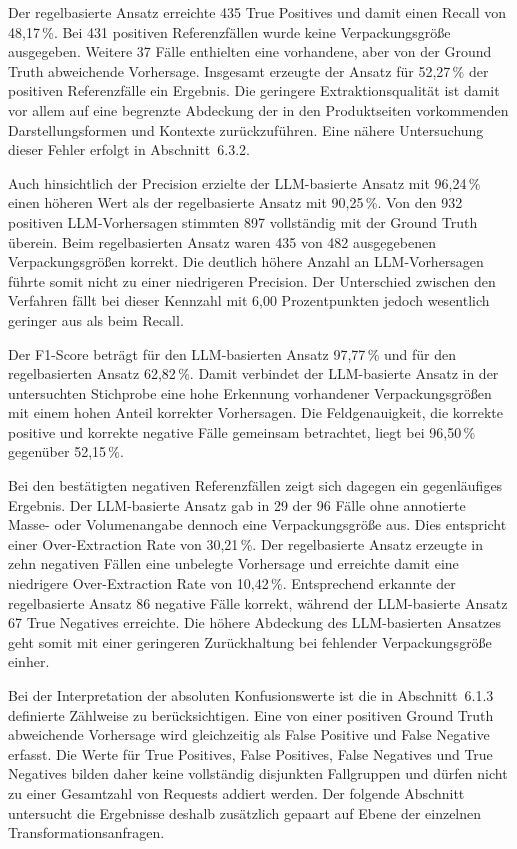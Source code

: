 Der regelbasierte Ansatz erreichte 435 True Positives und damit einen Recall von 48,17\,\%. Bei 431 positiven Referenzfällen wurde keine Verpackungsgröße ausgegeben. Weitere 37 Fälle enthielten eine vorhandene, aber von der Ground Truth abweichende Vorhersage. Insgesamt erzeugte der Ansatz für 52,27\,\% der positiven Referenzfälle ein Ergebnis. Die geringere Extraktionsqualität ist damit vor allem auf eine begrenzte Abdeckung der in den Produktseiten vorkommenden Darstellungsformen und Kontexte zurückzuführen. Eine nähere Untersuchung dieser Fehler erfolgt in Abschnitt~6.3.2.

Auch hinsichtlich der Precision erzielte der LLM-basierte Ansatz mit 96,24\,\% einen höheren Wert als der regelbasierte Ansatz mit 90,25\,\%. Von den 932 positiven LLM-Vorhersagen stimmten 897 vollständig mit der Ground Truth überein. Beim regelbasierten Ansatz waren 435 von 482 ausgegebenen Verpackungsgrößen korrekt. Die deutlich höhere Anzahl an LLM-Vorhersagen führte somit nicht zu einer niedrigeren Precision. Der Unterschied zwischen den Verfahren fällt bei dieser Kennzahl mit 6,00 Prozentpunkten jedoch wesentlich geringer aus als beim Recall.

Der F1-Score beträgt für den LLM-basierten Ansatz 97,77\,\% und für den regelbasierten Ansatz 62,82\,\%. Damit verbindet der LLM-basierte Ansatz in der untersuchten Stichprobe eine hohe Erkennung vorhandener Verpackungsgrößen mit einem hohen Anteil korrekter Vorhersagen. Die Feldgenauigkeit, die korrekte positive und korrekte negative Fälle gemeinsam betrachtet, liegt bei 96,50\,\% gegenüber 52,15\,\%.

Bei den bestätigten negativen Referenzfällen zeigt sich dagegen ein gegenläufiges Ergebnis. Der LLM-basierte Ansatz gab in 29 der 96 Fälle ohne annotierte Masse- oder Volumenangabe dennoch eine Verpackungsgröße aus. Dies entspricht einer Over-Extraction Rate von 30,21\,\%. Der regelbasierte Ansatz erzeugte in zehn negativen Fällen eine unbelegte Vorhersage und erreichte damit eine niedrigere Over-Extraction Rate von 10,42\,\%. Entsprechend erkannte der regelbasierte Ansatz 86 negative Fälle korrekt, während der LLM-basierte Ansatz 67 True Negatives erreichte. Die höhere Abdeckung des LLM-basierten Ansatzes geht somit mit einer geringeren Zurückhaltung bei fehlender Verpackungsgröße einher.

Bei der Interpretation der absoluten Konfusionswerte ist die in Abschnitt~6.1.3 definierte Zählweise zu berücksichtigen. Eine von einer positiven Ground Truth abweichende Vorhersage wird gleichzeitig als False Positive und False Negative erfasst. Die Werte für True Positives, False Positives, False Negatives und True Negatives bilden daher keine vollständig disjunkten Fallgruppen und dürfen nicht zu einer Gesamtzahl von Requests addiert werden. Der folgende Abschnitt untersucht die Ergebnisse deshalb zusätzlich gepaart auf Ebene der einzelnen Transformationsanfragen.

